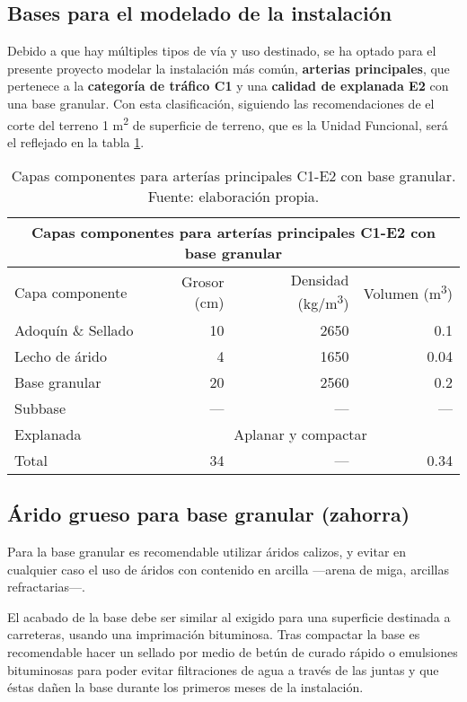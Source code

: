 \subsection{Bases para el modelado de la instalación}

Debido a que hay múltiples tipos de vía y uso destinado, se ha optado para el presente proyecto modelar la instalación más común, \textbf{arterias principales}, que pertenece a la \textbf{categoría de tráfico C1} y una \textbf{calidad de explanada E2} con una base granular. Con esta clasificación, siguiendo las recomendaciones de \cite{euroadoquinc} el corte del terreno 1 \si{m^2} de superficie de terreno, que es la Unidad Funcional, será el reflejado en la tabla \ref{cortedelterreno}.

\begin{table}[!htb]
\centering
\begin{tabular}{lrrr}
\toprule
\multicolumn{4}{c}{Capas componentes para arterías principales C1-E2 con base granular}\\
\midrule
Capa componente & Grosor (\si{cm}) & Densidad (\si{kg/m^3}) & Volumen (\si{m^3})\\
\midrule
Adoquín \& Sellado & 10 & 2650 & 0.1\\
Lecho de árido & 4 & 1650 & 0.04\\
Base granular & 20 & 2560 & 0.2\\
Subbase & — & — & —\\
Explanada & \multicolumn{3}{c}{Aplanar y compactar}\\
\midrule
Total & 34 & — & 0.34\\
\bottomrule
\end{tabular}
\caption[Capas componentes para arterías principales C1-E2 con base granular.]{Capas componentes para arterías principales C1-E2 con base granular. Fuente: elaboración propia.}
\label{cortedelterreno}
\end{table}

\subsection{Árido grueso para base granular (zahorra)}

Para la base granular es recomendable utilizar áridos calizos, y evitar en cualquier caso el uso de áridos con contenido en arcilla —arena de miga, arcillas refractarias—.

El acabado de la base debe ser similar al exigido para una superficie destinada a carreteras, usando una imprimación bituminosa. Tras compactar la base es recomendable hacer un sellado por medio de betún de curado rápido o emulsiones bituminosas para poder evitar filtraciones de agua a través de las juntas y que éstas dañen la base durante los primeros meses de la instalación.

